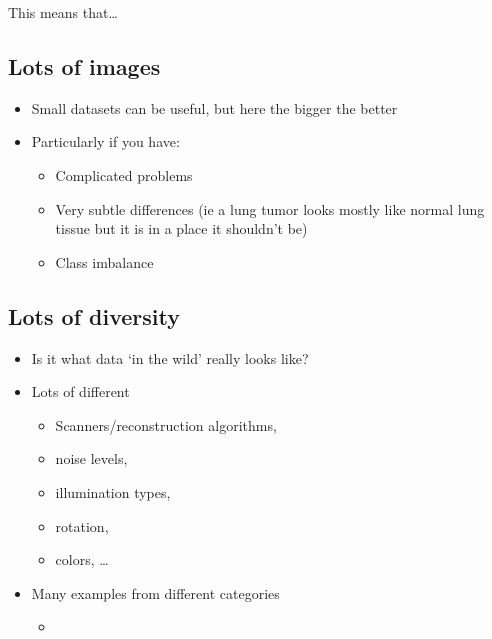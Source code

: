 \documentclass[letterpaper,10pt,english]{sphinxmanual}
\begin{document}
\sphinxAtStartPar
This means that…


\subsection{Lots of images}
\label{\detokenize{03-Datasets:lots-of-images}}\begin{itemize}
\item {} 
\sphinxAtStartPar
Small datasets can be useful, but here the bigger the better

\item {} 
\sphinxAtStartPar
Particularly if you have:
\begin{itemize}
\item {} 
\sphinxAtStartPar
Complicated problems

\item {} 
\sphinxAtStartPar
Very subtle differences (ie a lung tumor looks mostly like normal lung tissue but it is in a place it shouldn’t be)

\item {} 
\sphinxAtStartPar
Class imbalance

\end{itemize}

\end{itemize}


\subsection{Lots of diversity}
\label{\detokenize{03-Datasets:lots-of-diversity}}\begin{itemize}
\item {} 
\sphinxAtStartPar
Is it what data ‘in the wild’ really looks like?

\item {} 
\sphinxAtStartPar
Lots of different
\begin{itemize}
\item {} 
\sphinxAtStartPar
Scanners/reconstruction algorithms,

\item {} 
\sphinxAtStartPar
noise levels,

\item {} 
\sphinxAtStartPar
illumination types,

\item {} 
\sphinxAtStartPar
rotation,

\item {} 
\sphinxAtStartPar
colors, …

\end{itemize}

\item {} 
\sphinxAtStartPar
Many examples from different categories
\begin{itemize}
\item {} 
\sphinxAtStartPar
{}

\end{itemize}

\end{itemize}
\end{document}
